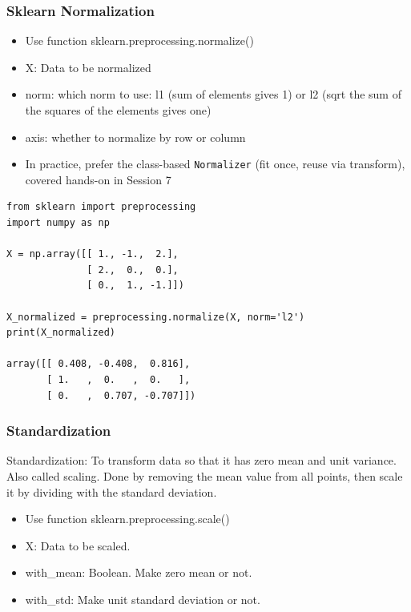 \begin{frame}[fragile]\frametitle{Sklearn Normalization}
	\begin{itemize}
	\item Use function sklearn.preprocessing.normalize()
	\item  X: Data to be normalized
	\item norm: which norm to use: l1 (sum of elements gives 1) or l2 (sqrt the sum of the squares of the elements gives one)
	\item axis: whether to normalize by row or column
	\item In practice, prefer the class-based \texttt{Normalizer} (fit once, reuse via transform), covered hands-on in Session 7
	\end{itemize}
\begin{lstlisting}
from sklearn import preprocessing
import numpy as np

X = np.array([[ 1., -1.,  2.],
              [ 2.,  0.,  0.],
              [ 0.,  1., -1.]])

X_normalized = preprocessing.normalize(X, norm='l2')
print(X_normalized)

array([[ 0.408, -0.408,  0.816],
       [ 1.   ,  0.   ,  0.   ],
       [ 0.   ,  0.707, -0.707]])
\end{lstlisting}
\end{frame}






\begin{frame}[fragile]\frametitle{Standardization}
Standardization: To transform data so that it has zero mean and unit variance. Also called scaling.
Done by removing the mean value from all points, then scale it by dividing with the standard deviation.
	\begin{itemize}
	\item Use function sklearn.preprocessing.scale()
	\item  X: Data to be scaled.
	\item with\_mean: Boolean. Make zero mean or not.
	\item with\_std: Make unit standard deviation or not.
	\end{itemize}
\end{frame}



